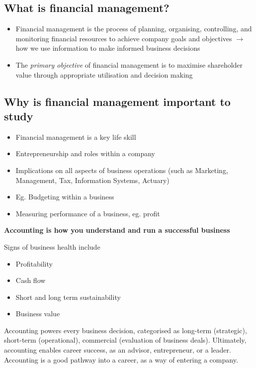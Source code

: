 \documentclass{article}
\begin{document}
	\subsection{What is financial management?}
		\begin{itemize}
			\item Financial management is the process of planning, organising, controlling, and monitoring financial resources to achieve company goals and objectives $\rightarrow$ how we use information to make informed business decisions
			\item The \textit{primary objective} of financial management is to maximise shareholder value through appropriate utilisation and decision making
		\end{itemize}

	\subsection{Why is financial management important to study}
		\begin{itemize}
			\item Financial management is a key life skill
			\item Entrepreneurship and roles within a company
			\item Implications on all aspects of business operations (such as Marketing, Management, Tax, Information Systems, Actuary)
			\item Eg. Budgeting within a business
			\item Measuring performance of a business, eg. profit
		\end{itemize}

		\textbf{Accounting is how you understand and run a successful business}

		Signs of business health include
			\begin{itemize}
				\item Profitability
				\item Cash flow
				\item Short and long term sustainability
				\item Business value
			\end{itemize}
		
		Accounting powers every business decision, categorised as long-term (strategic), short-term (operational), commercial (evaluation of business deals). Ultimately, accounting enables career success, as an advisor, entrepreneur, or a leader. Accounting is a good pathway into a career, as a way of entering a company. \\
		
\end{document}
